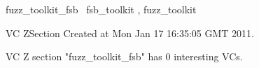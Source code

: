 \documentclass{article}
\begin{document}

\begin{zsection}
	 \SECTION fuzz\_toolkit\_fsb \parents~fsb\_toolkit , fuzz\_toolkit
\end{zsection}

VC ZSection Created at Mon Jan 17 16:35:05 GMT 2011.



 VC Z section "fuzz_toolkit_fsb" has $0$ interesting VCs.



\end{document}
